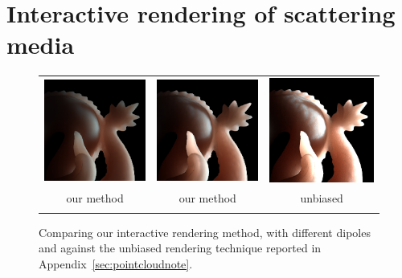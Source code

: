 \section{Interactive rendering of scattering media}
\label{sec:interactivedirssscontribution}
%
\begin{figure}[t]
\begin{tabular}{@{}c@{}c@{}c@{}}
\includegraphics[width=0.33\columnwidth]{figures/difference/dragon_shampoo_jensen} &
\includegraphics[width=0.33\columnwidth]{figures/difference/diff_dr_ours_small} &
\includegraphics[width=0.33\columnwidth]{figures/difference/diff_dr_ref_small} \\ 
our method & our method & unbiased  \\
\cite{Jensen2001} & \cite{Frisvad2014} & \cite{Frisvad2014}  \\
\end{tabular}
\caption{Comparing our interactive rendering method, with different dipoles and against the unbiased rendering technique reported in Appendix~\ref{sec:pointcloudnote}.}
\label{fig:interactivediff}
\end{figure}
%
